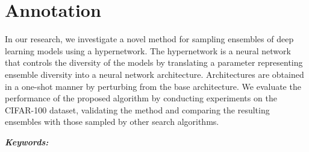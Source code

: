 \chapter*{Annotation}

In our research, we investigate a novel method for sampling ensembles of deep learning models using a hypernetwork. The hypernetwork is a neural network that controls the diversity of the models by translating a parameter representing ensemble diversity into a neural network architecture. Architectures are obtained in a one-shot manner by perturbing from the base architecture. We evaluate the performance of the proposed algorithm by conducting experiments on the CIFAR-100 dataset, validating the method and comparing the resulting ensembles with those sampled by other search algorithms.

\bigskip

\textbf{\textit{Keywords:}} \keywords

